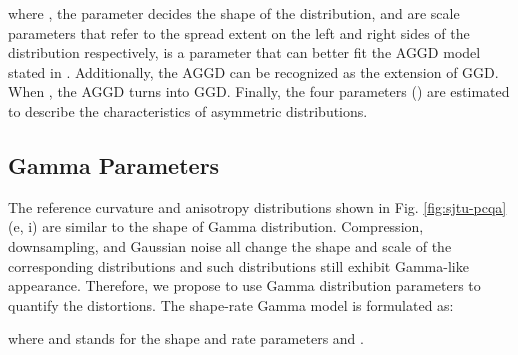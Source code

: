 \documentclass[lettersize,journal]{IEEEtran}
\begin{document}
where ,  the parameter  decides the shape of the distribution,  and  are scale parameters that refer to the spread extent on the left and right sides of the distribution respectively,  is a parameter that can better fit the AGGD model stated in \cite{brisque}. Additionally, the AGGD can be recognized as the extension of GGD. When , the AGGD turns into GGD. Finally, the four parameters () are estimated to describe the  characteristics of asymmetric distributions.



\subsection{Gamma Parameters}
The reference curvature and anisotropy distributions shown in Fig. \ref{fig:sjtu-pcqa} (e, i) are similar to the shape of Gamma distribution. Compression, downsampling, and Gaussian noise all change the shape and scale of the corresponding distributions and such distributions still exhibit Gamma-like appearance. Therefore, we propose to use Gamma distribution parameters to quantify the distortions. The shape-rate Gamma model is formulated as:

where  and  stands for the shape and rate parameters and . 
\end{document}
